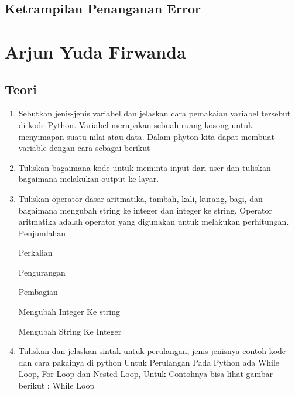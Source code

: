 \subsection{Ketrampilan Penanganan Error}
    



\section{Arjun Yuda Firwanda}
\subsection{Teori}
\begin{enumerate}
    \item Sebutkan jenis-jenis variabel dan jelaskan cara pemakaian variabel tersebut di
    kode Python.
    Variabel merupakan sebuah ruang kosong untuk menyimapan suatu nilai atau data. Dalam phyton kita dapat membuat variable dengan cara sebagai berikut
    

    \item Tuliskan bagaimana kode untuk meminta input dari user dan tuliskan bagaimana
    melakukan output ke layar.
    

    \item Tuliskan operator dasar aritmatika, tambah, kali, kurang, bagi, dan bagaimana
    mengubah string ke integer dan integer ke string.
    Operator  aritmatika adalah operator yang digunakan untuk melakukan perhitungan.
    Penjumlahan
    

    Perkalian
    

    Pengurangan
    

    Pembagian
    

    Mengubah Integer Ke string
    

    Mengubah String Ke Integer
    

    \item Tuliskan dan jelaskan sintak untuk perulangan, jenis-jenisnya contoh kode dan
    cara pakainya di python
    Untuk Perulangan Pada Python ada While Loop, For Loop dan Nested Loop, Untuk Contohnya bisa lihat gambar berikut :
    While Loop
    


\end{enumerate}

